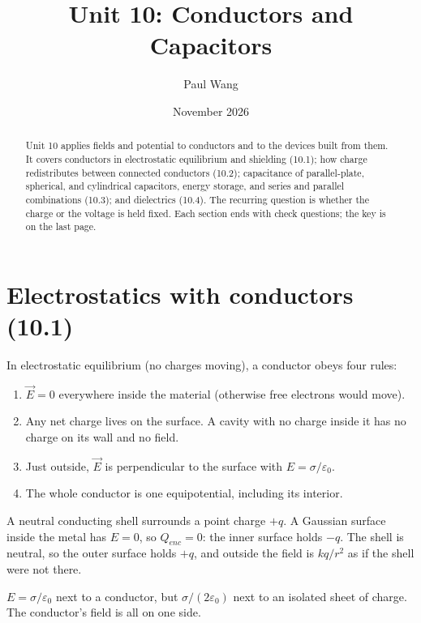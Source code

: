 \documentclass[11pt]{article}
\title{Unit 10: Conductors and Capacitors}
\author{Paul Wang}
\date{November 2026}
\begin{document}
\maketitle

\begin{abstract}
Unit 10 applies fields and potential to conductors and to the devices built from them. It covers conductors in electrostatic equilibrium and shielding (10.1); how charge redistributes between connected conductors (10.2); capacitance of parallel-plate, spherical, and cylindrical capacitors, energy storage, and series and parallel combinations (10.3); and dielectrics (10.4). The recurring question is whether the charge or the voltage is held fixed. Each section ends with check questions; the key is on the last page.
\end{abstract}


\section{Electrostatics with conductors (10.1)}\label{sec:1}

In electrostatic equilibrium (no charges moving), a conductor obeys four rules:
\begin{enumerate}[label=(\arabic*)]
\item $\vec E = 0$ everywhere inside the material (otherwise free electrons would move).
\item Any net charge lives on the surface. A cavity with no charge inside it has no charge on its wall and no field.
\item Just outside, $\vec E$ is perpendicular to the surface with $E = \sigma/\varepsilon_0$.
\item The whole conductor is one equipotential, including its interior.
\end{enumerate}
\begin{example}
A neutral conducting shell surrounds a point charge $+q$. A Gaussian surface inside the metal has $E = 0$, so $Q_{enc} = 0$: the inner surface holds $-q$. The shell is neutral, so the outer surface holds $+q$, and outside the field is $kq/r^2$ as if the shell were not there.
\end{example}
\begin{trap}
$E = \sigma/\varepsilon_0$ next to a conductor, but $\sigma/(2\varepsilon_0)$ next to an isolated sheet of charge. The conductor's field is all on one side.
\end{trap}
\end{document}
